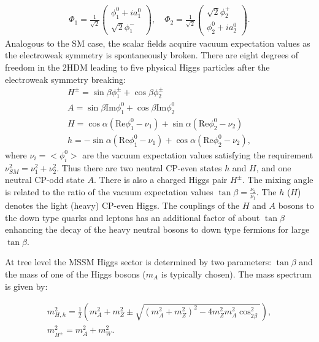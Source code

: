 \begin{eqnarray} \label{eq:2hdm}
\Phi_1  = \frac{1}{\sqrt{2}}\left(\begin{array}{c} \phi^{0}_1+ia_1^0 \\ \sqrt{2}\phi^{-}_1 \end{array} \right), \quad \Phi_2  = \frac{1}{\sqrt{2}}\left(\begin{array}{c} \sqrt{2}\phi^{+}_2 \\ \phi^{0}_2+ia_2^0 \end{array} \right).
\end{eqnarray}    
Analogous to the SM case, the scalar fields acquire vacuum expectation values as the electroweak symmetry is spontaneously broken. There are eight degrees of freedom in the 2HDM leading to five physical Higgs particles after the electroweak symmetry breaking:
\begin{eqnarray} \label{eq:mssm_higgs}
H^{\pm} = \sin \beta \phi_1^{\pm} + \cos \beta \phi_2^{\pm} \\
A  = \sin \beta \mathrm{Im}\phi_1^{0} + \cos \beta \mathrm{Im}\phi_2^{0} \\
H  = \cos \alpha(\mathrm{Re}\phi_1^{0}-\nu_1) + \sin \alpha (\mathrm{Re}\phi_2^{0}-\nu_2) \\
h  = -\sin \alpha(\mathrm{Re}\phi_1^{0}-\nu_1) + \cos \alpha (\mathrm{Re}\phi_2^{0}-\nu_2),
\end{eqnarray}   
where $\nu_i=<\phi_i^0>$ are the vacuum expectation values satisfying the requirement $\nu_{SM}^2 = \nu_1^2 + \nu_2^2$. Thus there are two neutral CP-even states $h$ and $H$, and one neutral CP-odd state $A$. There is also a charged Higgs pair $H^{\pm}$. The mixing angle is related to the ratio of the vacuum expectation values $\tan \beta = \frac{\nu_2}{\nu_1}$. The $h$ ($H$) denotes the light (heavy) CP-even Higgs. The couplings of the $H$ and $A$ bosons to the down type quarks and leptons has an additional factor of about $\tan \beta$ enhancing the decay of the heavy neutral bosons to down type fermions for large $\tan \beta$.

At tree level the MSSM Higgs sector is determined by two parameters: $\tan \beta$ and the mass of one of the Higgs bosons ($m_{A}$ is typically chosen). The mass spectrum is given by:

\begin{eqnarray} \label{eq:mssm_mass}
m_{H,h}^2 = \frac{1}{2} (m_A^2 + m_Z^2 \pm \sqrt{(m_A^2+m_Z^2)^2-4m_Z^2m_A^2\cos^2_{2\beta}}), \\
m_{H^{\pm}}^2 = m_{A}^2 + m_{W}^2.
\end{eqnarray}   

